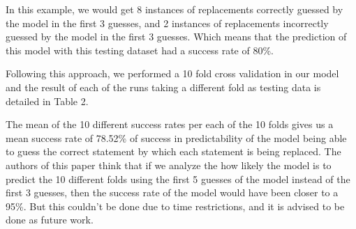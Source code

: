 In this example, we would get 8 instances of replacements correctly guessed by the model in the first 3 guesses, and 2 instances of replacements incorrectly guessed by the model in the first 3 guesses. Which means that the prediction of this model with this testing dataset had a success rate of 80\%.

Following this approach, we performed a 10 fold cross validation in our model and the result of each of the runs taking a different fold as testing data is detailed in Table 2.


\begin{table*}
	\centering
		\caption{10 Fold cross validation of the probabilistic model}\label{tab:likeliness}
\end{table*}

The mean of the 10 different success rates per each of the 10 folds gives us a mean success rate of 78.52\% of success in predictability of the model being able to guess the correct statement by which each statement is being replaced.  
The authors of this paper think that if we analyze the how likely the model is to predict the 10 different folds using the first 5 guesses of the model instead of the first 3 guesses, then the success rate of the model would have been closer to a 95\%. But this couldn't be done due to time restrictions, and it is advised to be done as future work.
